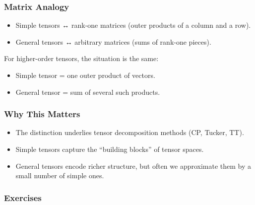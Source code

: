 \documentclass[
  letterpaper,
  DIV=11,
  numbers=noendperiod]{scrreprt}
\providecommand{\tightlist}{%
  \setlength{\itemsep}{0pt}\setlength{\parskip}{0pt}}
\begin{document}
\subsubsection{Matrix Analogy}\label{matrix-analogy}

\begin{itemize}
\tightlist
\item
  Simple tensors ↔ rank-one matrices (outer products of a column and a
  row).
\item
  General tensors ↔ arbitrary matrices (sums of rank-one pieces).
\end{itemize}

For higher-order tensors, the situation is the same:

\begin{itemize}
\tightlist
\item
  Simple tensor = one outer product of vectors.
\item
  General tensor = sum of several such products.
\end{itemize}

\subsubsection{Why This Matters}\label{why-this-matters-7}

\begin{itemize}
\tightlist
\item
  The distinction underlies tensor decomposition methods (CP, Tucker,
  TT).
\item
  Simple tensors capture the ``building blocks'' of tensor spaces.
\item
  General tensors encode richer structure, but often we approximate them
  by a small number of simple ones.
\end{itemize}

\subsubsection{Exercises}\label{exercises-17}
\end{document}
